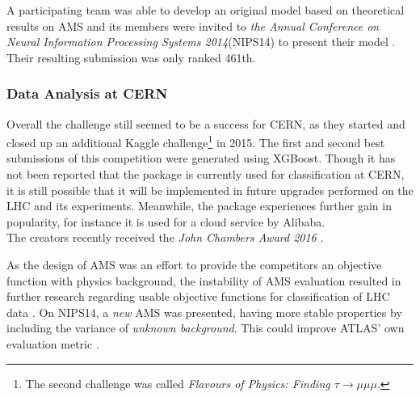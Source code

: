 A participating team was able to develop an original model based on theoretical results on AMS and its members were invited to \emph{the Annual Conference on Neural Information Processing Systems 2014}(NIPS14) to present their model  \cite{mack14}. Their resulting submission was only ranked 461th.

\subsubsection{Data Analysis at CERN}
Overall the challenge still seemed to be a success for CERN, as they started and closed up an additional Kaggle challenge\footnote{The second challenge was called \emph{Flavours of Physics: Finding $\tau \rightarrow \mu\mu\mu$}.} in 2015. The first and second best submissions of this competition were generated using XGBoost. Though it has not been reported that the package is currently used for classification at CERN, it is still possible that it will be implemented in future upgrades performed on the LHC and its experiments. Meanwhile, the package experiences further gain in popularity, for instance it is used for a cloud service by Alibaba.\\
The creators recently received the \emph{John Chambers Award 2016} \cite{xgbgit}.

As the design of AMS was an effort to provide the competitors an objective function with physics background, the instability of AMS evaluation resulted in further research regarding usable objective functions for classification of LHC data \cite{HEPml}. On NIPS14, a \emph{new} AMS was presented, having more stable properties by including the variance of \emph{unknown background}. This could improve ATLAS' own evaluation metric \cite{kegl14}.


	{\pagebreak \thispagestyle{empty} \cleardoublepage}{\clearpage}